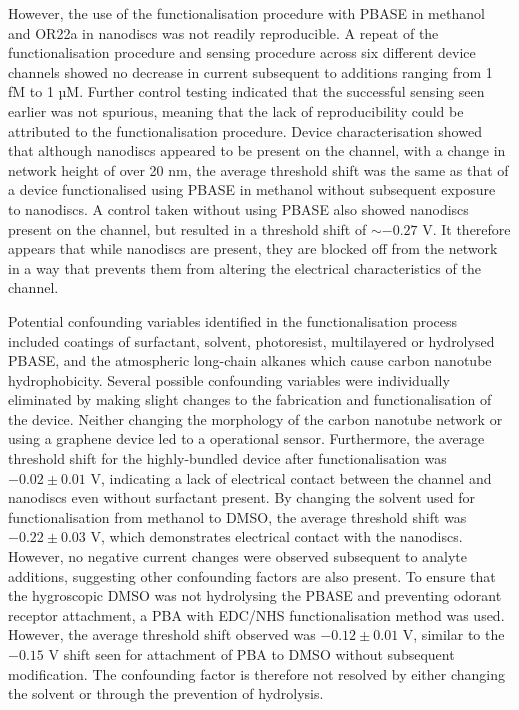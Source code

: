 \documentclass[
  a4paper,
]{scrbook}
\begin{document}
However, the use of the functionalisation procedure with PBASE in
methanol and OR22a in nanodiscs was not readily reproducible. A repeat
of the functionalisation procedure and sensing procedure across six
different device channels showed no decrease in current subsequent to
additions ranging from 1 fM to 1 µM. Further control testing indicated
that the successful sensing seen earlier was not spurious, meaning that
the lack of reproducibility could be attributed to the functionalisation
procedure. Device characterisation showed that although nanodiscs
appeared to be present on the channel, with a change in network height
of over 20 nm, the average threshold shift was the same as that of a
device functionalised using PBASE in methanol without subsequent
exposure to nanodiscs. A control taken without using PBASE also showed
nanodiscs present on the channel, but resulted in a threshold shift of
\(\sim -0.27\) V. It therefore appears that while nanodiscs are present,
they are blocked off from the network in a way that prevents them from
altering the electrical characteristics of the channel.

Potential confounding variables identified in the functionalisation
process included coatings of surfactant, solvent, photoresist,
multilayered or hydrolysed PBASE, and the atmospheric long-chain alkanes
which cause carbon nanotube hydrophobicity. Several possible confounding
variables were individually eliminated by making slight changes to the
fabrication and functionalisation of the device. Neither changing the
morphology of the carbon nanotube network or using a graphene device led
to a operational sensor. Furthermore, the average threshold shift for
the highly-bundled device after functionalisation was \(−0.02 \pm 0.01\)
V, indicating a lack of electrical contact between the channel and
nanodiscs even without surfactant present. By changing the solvent used
for functionalisation from methanol to DMSO, the average threshold shift
was \(−0.22 \pm 0.03\) V, which demonstrates electrical contact with the
nanodiscs. However, no negative current changes were observed subsequent
to analyte additions, suggesting other confounding factors are also
present. To ensure that the hygroscopic DMSO was not hydrolysing the
PBASE and preventing odorant receptor attachment, a PBA with EDC/NHS
functionalisation method was used. However, the average threshold shift
observed was \(-0.12 \pm 0.01\) V, similar to the \(-0.15\) V shift seen
for attachment of PBA to DMSO without subsequent modification. The
confounding factor is therefore not resolved by either changing the
solvent or through the prevention of hydrolysis.
\end{document}

